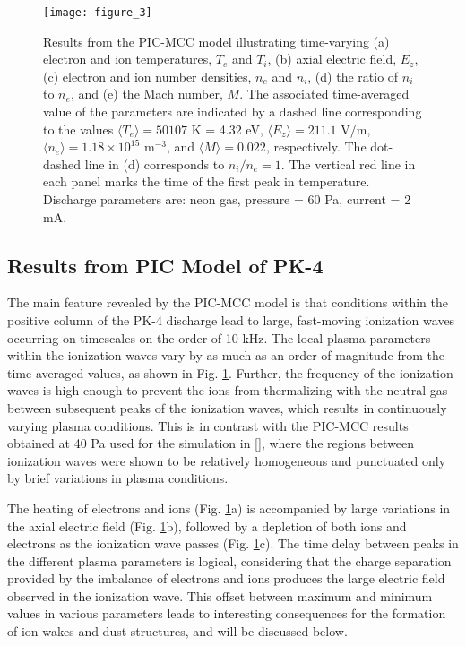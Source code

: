 \documentclass[aip,amsmath,amssymb,graphicx,floatfix,reprint]{revtex4-1}
\begin{document}
\begin{figure}[b]
\texttt{[image: figure\_3]}
\caption{Results from the PIC-MCC model illustrating time-varying (a) electron and ion temperatures, $T_e$ and $T_i$, (b) axial electric field, $E_z$, (c) electron and ion number densities, $n_e$ and $n_i$, (d) the ratio of $n_i$ to $n_e$, and (e) the Mach number, $M$.  The associated time-averaged value of the parameters are indicated by a dashed line corresponding to the values $\langle T_e\rangle  = 50107$ K = 4.32 eV, $ \langle E_z \rangle  = 211.1 $ V/m, $\langle n_e\rangle  = 1.18 \times 10^{15}$ m$^{-3}$, and $\langle M \rangle = 0.022$, respectively.  The dot-dashed line in (d) corresponds to $n_i/n_e = 1$.  The vertical red line in each panel marks the time of the first peak in temperature.  Discharge parameters are: neon gas, pressure = 60 Pa, current = 2 mA.}
\label{fig:PICdata}
\end{figure}

\subsection{Results from PIC Model of PK-4}
\label{PIC results}
The main feature revealed by the PIC-MCC model is that conditions within the positive column of the PK-4 discharge lead to large, fast-moving ionization waves occurring on timescales on the order of 10 kHz. The local plasma parameters within the ionization waves vary by as much as an order of magnitude from the time-averaged values, as shown in Fig. \ref{fig:PICdata}.  Further, the frequency of the ionization waves is high enough to prevent the ions from thermalizing with the neutral gas between subsequent peaks of the ionization waves, which results in continuously varying plasma conditions.  This is in contrast with the PIC-MCC results obtained at 40 Pa used for the simulation in [], where the regions between ionization waves were shown to be relatively homogeneous and punctuated only by brief variations in plasma conditions.

The heating of electrons and ions (Fig. \ref{fig:PICdata}a) is accompanied by large variations in the axial electric field (Fig. \ref{fig:PICdata}b), followed by a depletion of both ions and electrons as the ionization wave passes (Fig. \ref{fig:PICdata}c).  The time delay between peaks in the different plasma parameters is logical, considering that the charge separation provided by the imbalance of electrons and ions produces the large electric field observed in the ionization wave.  This offset between maximum and minimum values in various parameters leads to interesting consequences for the formation of ion wakes and dust structures, and will be discussed below.  
\end{document}
